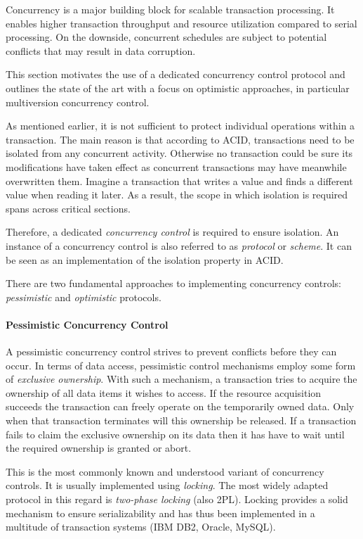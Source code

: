 Concurrency is a major building block for scalable transaction processing. It
enables higher transaction throughput and resource utilization compared to
serial processing. On the downside, concurrent schedules are subject to
potential conflicts that may result in data corruption.

This section motivates the use of a dedicated concurrency control protocol and
outlines the state of the art with a focus on optimistic approaches, in
particular multiversion concurrency control.

As mentioned earlier, it is not sufficient to protect individual operations
within a transaction. The main reason is that according to ACID, transactions
need to be isolated from any concurrent activity. Otherwise no transaction could
be sure its modifications have taken effect as concurrent transactions may have
meanwhile overwritten them. Imagine a transaction that writes a value and finds
a different value when reading it later. As a result, the scope in which
isolation is required spans across critical sections.

Therefore, a dedicated \emph{concurrency control} is required to ensure
isolation. An instance of a concurrency control is also referred to as
\emph{protocol} or \emph{scheme}. It can be seen as an implementation of the
isolation property in ACID.


There are two fundamental approaches to implementing concurrency controls:
\emph{pessimistic} and \emph{optimistic} protocols.

\paragraph{Pessimistic Concurrency Control} %
A pessimistic concurrency control strives to prevent conflicts before they can
occur. In terms of data access, pessimistic control mechanisms employ some form
of \emph{exclusive ownership}. With such a mechanism, a transaction tries to
acquire the ownership of all data items it wishes to access. If the resource
acquisition succeeds the transaction can freely operate on the temporarily owned
data. Only when that transaction terminates will this ownership be released. If
a transaction fails to claim the exclusive ownership on its data then it has
have to wait until the required ownership is granted or abort.

This is the most commonly known and understood variant of concurrency controls.
It is usually implemented using \emph{locking}. The most widely adapted protocol
in this regard is \emph{two-phase locking} (also 2PL). Locking provides a solid
mechanism to ensure serializability and has thus been implemented in a multitude
of transaction systems (IBM DB2, Oracle, MySQL).

